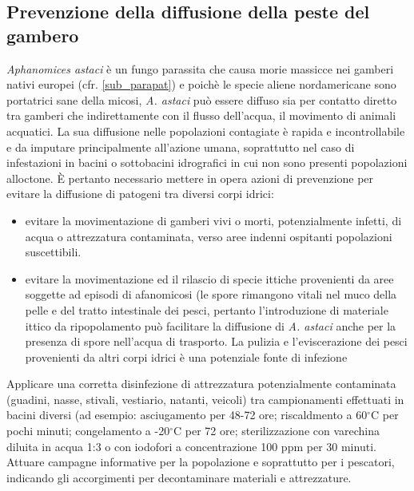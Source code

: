\documentclass[11pt,a4paper,italian,twoside,openany]{memoir}
\begin{document}
\subsection{Prevenzione della diffusione della peste del gambero}
\emph{Aphanomices astaci} è un fungo parassita che causa morie massicce nei gamberi nativi europei (cfr. \ref{sub_parapat}) e poichè le specie aliene nordamericane sono portatrici sane della micosi, \emph{A. astaci} può essere diffuso sia per contatto diretto tra gamberi che indirettamente con il flusso dell'acqua, il movimento di animali acquatici. La sua diffusione nelle popolazioni contagiate è rapida e incontrollabile e da imputare principalmente all'azione umana, soprattutto nel caso di infestazioni in bacini o sottobacini idrografici in cui non sono presenti popolazioni alloctone. È pertanto necessario mettere in opera azioni di prevenzione per evitare la diffusione di patogeni tra diversi corpi idrici:
\begin{itemize} 
  \item evitare la movimentazione di gamberi vivi o morti, potenzialmente infetti, di acqua o attrezzatura contaminata, verso aree indenni ospitanti popolazioni suscettibili.
  \item evitare la movimentazione ed il rilascio di specie ittiche provenienti da aree soggette ad episodi di afanomicosi (le spore rimangono vitali nel muco della pelle e del tratto intestinale dei pesci, pertanto l'introduzione di materiale ittico da ripopolamento può facilitare la diffusione di \emph{A. astaci} anche per la presenza di spore nell'acqua di trasporto. La pulizia e l'eviscerazione dei pesci provenienti da altri corpi idrici è una potenziale fonte di infezione 
\end{itemize}

Applicare una corretta disinfezione di attrezzatura potenzialmente contaminata (guadini, nasse, stivali, vestiario, natanti, veicoli) tra campionamenti effettuati in bacini diversi (ad esempio: asciugamento per 48-72 ore; riscaldmento a 60$^{\circ}$C per pochi minuti; congelamento a -20$^{\circ}$C per 72 ore; sterilizzazione con varechina diluita in acqua 1:3 o con iodofori a concentrazione 100 ppm per 30 minuti.
Attuare campagne informative per la popolazione e soprattutto per i pescatori, indicando gli accorgimenti per decontaminare materiali e attrezzature. 
\end{document}
